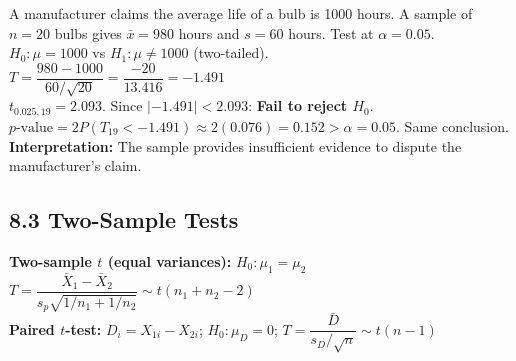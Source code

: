 \documentclass[12pt]{article}
\begin{document}
\begin{examplebox}
A manufacturer claims the average life of a bulb is 1000 hours. A sample of $n=20$ bulbs gives $\bar x=980$ hours and $s=60$ hours. Test at $\alpha=0.05$.\\[6pt]
$H_0:\mu=1000$ vs $H_1:\mu\neq1000$ (two-tailed).\\[4pt]
$T=\dfrac{980-1000}{60/\sqrt{20}}=\dfrac{-20}{13.416}=-1.491$\\[4pt]
$t_{0.025,19}=2.093$. Since $|-1.491|<2.093$: \textbf{Fail to reject $H_0$}.\\[4pt]
$p\text{-value}=2P(T_{19}<-1.491)\approx2(0.076)=0.152>\alpha=0.05$. Same conclusion.\\[4pt]
\textbf{Interpretation:} The sample provides insufficient evidence to dispute the manufacturer's claim.
\end{examplebox}

\subsection{8.3 Two-Sample Tests}

\begin{formulabox}
\textbf{Two-sample $t$ (equal variances):} $H_0:\mu_1=\mu_2$\\
$T=\dfrac{\bar X_1-\bar X_2}{s_p\sqrt{1/n_1+1/n_2}}\sim t(n_1+n_2-2)$\\[8pt]
\textbf{Paired $t$-test:} $D_i=X_{1i}-X_{2i}$;\; $H_0:\mu_D=0$;\; $T=\dfrac{\bar D}{s_D/\sqrt n}\sim t(n-1)$
\end{formulabox}
\end{document}
